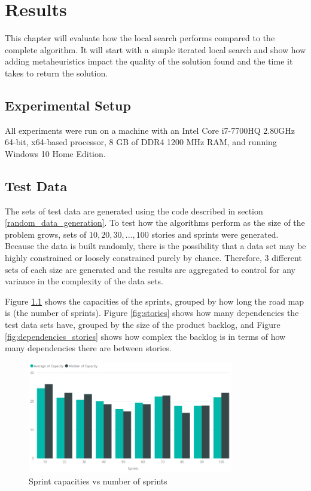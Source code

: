 
\chapter{Results}
\label{ChapterResults}

This chapter will evaluate how the local search performs compared to the complete algorithm. It will start with a simple iterated local search and show how adding metaheuristics impact the quality of the solution found and the time it takes to return the solution.

\section{Experimental Setup}
All experiments were run on a machine with an Intel Core i7-7700HQ 2.80GHz 64-bit, x64-based processor, 8 GB of DDR4 1200 MHz RAM, and running Windows 10 Home Edition.

\section{Test Data}
The sets of test data are generated using the code described in section \ref{random_data_generation}. To test how the algorithms perform as the size of the problem grows, sets of $10, 20, 30, ..., 100$ stories and sprints were generated. Because the data is built randomly, there is the possibility that a data set may be highly constrained or loosely constrained purely by chance. Therefore, 3 different sets of each size are generated and the results are aggregated to control for any variance in the complexity of the data sets.

Figure \ref{fig:sprints} shows the capacities of the sprints, grouped by how long the road map is (the number of sprints). Figure \ref{fig:stories} shows how many dependencies the test data sets have, grouped by the size of the product backlog, and Figure \ref{fig:dependencies_stories} shows how complex the backlog is in terms of how many dependencies there are between stories.

\begin{figure}[h!]
    \centering
    \includegraphics[width=0.8\textwidth]{Figures/TestData/sprints.png}
    \caption{Sprint capacities vs number of sprints}
    \label{fig:sprints}
\end{figure}


